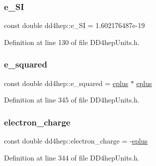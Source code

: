 \subsubsection{\texorpdfstring{e\+\_\+\+SI}{e\_SI}}
{\footnotesize\ttfamily const double dd4hep\+::e\+\_\+\+SI = 1.\+602176487e-\/19\hspace{0.3cm}{\ttfamily [static]}}



Definition at line 130 of file D\+D4hep\+Units.\+h.

\hypertarget{namespacedd4hep_a23b1828a7d7d90dc182eee3716cf27f6}{}\label{namespacedd4hep_a23b1828a7d7d90dc182eee3716cf27f6} 
\subsubsection{\texorpdfstring{e\+\_\+squared}{e\_squared}}
{\footnotesize\ttfamily const double dd4hep\+::e\+\_\+squared = \hyperlink{namespacedd4hep_a96ccff254b6dcebf179c3630f6205857}{eplus} $\ast$ \hyperlink{namespacedd4hep_a96ccff254b6dcebf179c3630f6205857}{eplus}\hspace{0.3cm}{\ttfamily [static]}}



Definition at line 345 of file D\+D4hep\+Units.\+h.

\hypertarget{namespacedd4hep_ab3cc7a4c1edb82d85112753196db9368}{}\label{namespacedd4hep_ab3cc7a4c1edb82d85112753196db9368} 
\subsubsection{\texorpdfstring{electron\+\_\+charge}{electron\_charge}}
{\footnotesize\ttfamily const double dd4hep\+::electron\+\_\+charge = -\/\hyperlink{namespacedd4hep_a96ccff254b6dcebf179c3630f6205857}{eplus}\hspace{0.3cm}{\ttfamily [static]}}



Definition at line 344 of file D\+D4hep\+Units.\+h.

\hypertarget{namespacedd4hep_ae9b92fa47cc9555cea0d6fa97a9036a3}{}\label{namespacedd4hep_ae9b92fa47cc9555cea0d6fa97a9036a3} 
